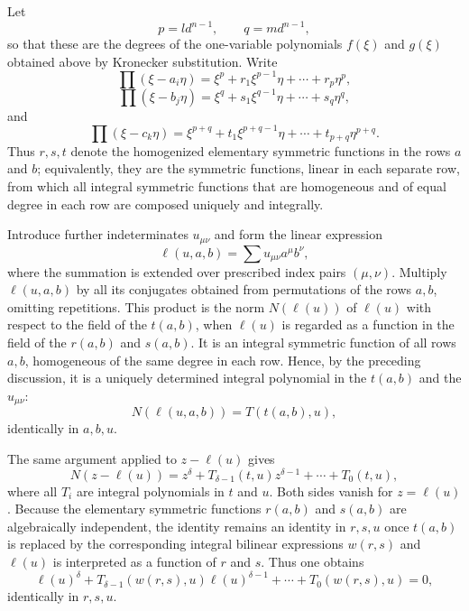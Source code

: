 \documentclass[12pt]{article}
\begin{document}
Let
\[
  p = l d^{n-1}, \qquad q = m d^{n-1},
\]
so that these are the degrees of the one-variable polynomials $f(\xi)$ and $g(\xi)$ obtained above by Kronecker substitution. Write
\[
  \prod (\xi-a_i\eta)=\xi^p+r_1\xi^{p-1}\eta+\cdots+r_p\eta^p,
\]
\[
  \prod (\xi-b_j\eta)=\xi^q+s_1\xi^{q-1}\eta+\cdots+s_q\eta^q,
\]
and
\[
  \prod (\xi-c_k\eta)=\xi^{p+q}+t_1\xi^{p+q-1}\eta+\cdots+t_{p+q}\eta^{p+q}.
\]
Thus $r,s,t$ denote the homogenized elementary symmetric functions in the rows $a$ and $b$; equivalently, they are the symmetric functions, linear in each separate row, from which all integral symmetric functions that are homogeneous and of equal degree in each row are composed uniquely and integrally.

Introduce further indeterminates $u_{\mu\nu}$ and form the linear expression
\begin{equation}
  \ell(u,a,b)=\sum u_{\mu\nu} a^\mu b^\nu,                         \tag{9}
\end{equation}
where the summation is extended over prescribed index pairs $(\mu,\nu)$. Multiply $\ell(u,a,b)$ by all its conjugates obtained from permutations of the rows $a,b$, omitting repetitions. This product is the norm $N(\ell(u))$ of $\ell(u)$ with respect to the field of the $t(a,b)$, when $\ell(u)$ is regarded as a function in the field of the $r(a,b)$ and $s(a,b)$. It is an integral symmetric function of all rows $a,b$, homogeneous of the same degree in each row. Hence, by the preceding discussion, it is a uniquely determined integral polynomial in the $t(a,b)$ and the $u_{\mu\nu}$:
\begin{equation}
  N(\ell(u,a,b)) = T(t(a,b),u),                                      \tag{10}
\end{equation}
identically in $a,b,u$.

The same argument applied to $z-\ell(u)$ gives
\[
 N(z-\ell(u))=z^\delta+T_{\delta-1}(t,u)z^{\delta-1}+\cdots+T_0(t,u),
\]
where all $T_i$ are integral polynomials in $t$ and $u$. Both sides vanish for $z=\ell(u)$. Because the elementary symmetric functions $r(a,b)$ and $s(a,b)$ are algebraically independent, the identity remains an identity in $r,s,u$ once $t(a,b)$ is replaced by the corresponding integral bilinear expressions $w(r,s)$ and $\ell(u)$ is interpreted as a function of $r$ and $s$. Thus one obtains
\begin{equation}
  \ell(u)^\delta+T_{\delta-1}(w(r,s),u)\ell(u)^{\delta-1}+\cdots+T_0(w(r,s),u)=0,        \tag{11}
\end{equation}
identically in $r,s,u$.
\end{document}
